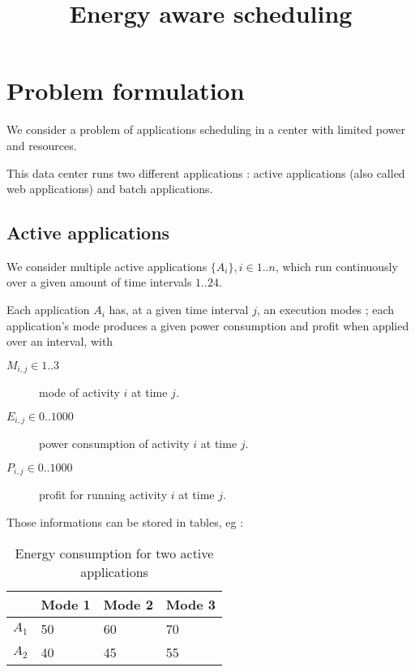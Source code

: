 \documentclass[a4paper]{article}
\begin{document}
\title{Energy aware scheduling}

\maketitle

\section{Problem formulation}

We consider a problem of applications scheduling in a center with limited power and resources.


This data center runs two different applications : active applications (also called web applications) and batch applications.

\subsection{Active applications}

We consider multiple active applications $\{A_{i}\}, i \in 1..n$, which run continuously over a given amount of time intervals $1..24$.

Each application $A_i$ has, at a given time interval $j$, an execution modes ; each application's mode produces a given power consumption and profit when applied over an interval, with
\begin{description}
 \item[$M_{i,j} \in 1..3$] mode of activity $i$ at time $j$.
 \item[$E_{i,j} \in 0..1000$] power consumption of activity $i$ at time $j$.
 \item[$P_{i,j} \in 0..1000$] profit for running activity $i$ at time $j$.
\end{description}

Those informations can be stored in tables, eg :

\begin{table}[H]
\begin{center}
  \begin{tabular}{ | l | l | l | l |}
     \hline
      & Mode 1 & Mode 2 & Mode 3 \\ \hline
    $A_1$ & 50 & 60 & 70 \\ \hline
    $A_2$ & 40 & 45 & 55 \\
    \hline
    \end{tabular}
\end{center}
\caption{Energy consumption for two active applications}
\end{table}
\end{document}

